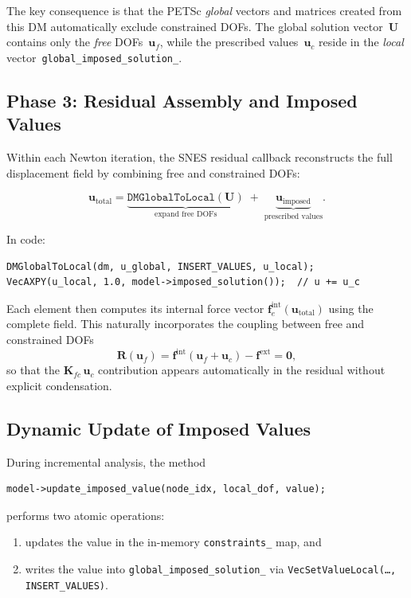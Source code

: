 The key consequence is that the PETSc \emph{global} vectors and
matrices created from this DM automatically exclude constrained DOFs.
The global solution vector~$\mathbf{U}$ contains only the
\emph{free} DOFs~$\mathbf{u}_f$, while the prescribed values~$\mathbf{u}_c$
reside in the \emph{local} vector~\verb|global_imposed_solution_|.

\subsection{Phase 3: Residual Assembly and Imposed Values}
\label{ssec:bc-residual}

Within each Newton iteration, the SNES residual callback reconstructs
the full displacement field by combining free and constrained DOFs:

\begin{equation}
  \mathbf{u}_{\text{total}} =
    \underbrace{\texttt{DMGlobalToLocal}(\mathbf{U})}_{\text{expand free DOFs}}
    \;+\;
    \underbrace{\mathbf{u}_{\text{imposed}}}_{\text{prescribed values}}.
  \label{eq:u-total}
\end{equation}

In code:
\begin{lstlisting}
DMGlobalToLocal(dm, u_global, INSERT_VALUES, u_local);
VecAXPY(u_local, 1.0, model->imposed_solution());  // u += u_c
\end{lstlisting}

Each element then computes its internal force vector
$\mathbf{f}_e^{\text{int}}(\mathbf{u}_{\text{total}})$ using the
complete field.  This naturally incorporates the coupling between free
and constrained DOFs
\begin{equation}
  \mathbf{R}(\mathbf{u}_f)
    = \mathbf{f}^{\text{int}}(\mathbf{u}_f + \mathbf{u}_c) - \mathbf{f}^{\text{ext}}
    = \mathbf{0},
  \label{eq:residual-with-bc}
\end{equation}
so that the $\mathbf{K}_{fc}\,\mathbf{u}_c$ contribution appears
automatically in the residual without explicit condensation.

\subsection{Dynamic Update of Imposed Values}
\label{ssec:bc-update-imposed}

During incremental analysis, the method
\begin{lstlisting}
model->update_imposed_value(node_idx, local_dof, value);
\end{lstlisting}
performs two atomic operations:
\begin{enumerate}
  \item updates the value in the in-memory \texttt{constraints\_} map, and
  \item writes the value into
    \texttt{global\_imposed\_solution\_} via
    \texttt{VecSetValueLocal(\ldots, INSERT\_VALUES)}.
\end{enumerate}

